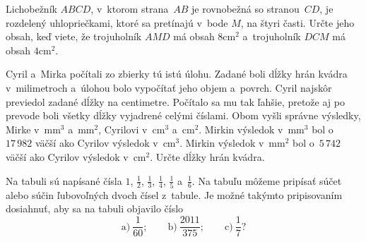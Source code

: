 {%
Lichobežník $ABCD$, v~ktorom strana~$AB$ je rovnobežná so stranou~$CD$, je
rozdelený uhlopriečkami, ktoré sa pretínajú v~bode $M$, na štyri časti.
Určte jeho obsah, keď viete, že trojuholník $AMD$ má obsah
$8\text{cm}^2$ a~trojuholník $DCM$  má obsah $4\text{cm}^2$.}

{%
Cyril a~Mirka počítali zo zbierky tú istú úlohu. Zadané boli dĺžky hrán
kvádra v~milimetroch a~úlohou bolo vypočítať jeho objem a~povrch. Cyril
najskôr previedol zadané dĺžky na centimetre. Počítalo sa mu tak ľahšie,
pretože aj po prevode boli všetky dĺžky vyjadrené celými číslami. Obom vyšli
správne výsledky, Mirke v~$\text{mm}^3$ a~$\text{mm}^2$, Cyrilovi v~$\text{cm}^3$ a~$\text{cm}^2$. Mirkin výsledok
v~$\text{mm}^3$ bol o~$17\,982$ väčší ako Cyrilov výsledok v~$\text{cm}^3$. Mirkin výsledok v~$\text{mm}^2$
bol o~$5\,742$ väčší ako Cyrilov výsledok v~$\text{cm}^2$. Určte dĺžky hrán kvádra.}

{%
Na tabuli sú napísané čísla $1$, $\frac12$, $\frac13$, $\frac14$,
$\frac15$ a~$\frac16$.
Na tabuľu môžeme pripísať súčet alebo súčin ľubovoľných dvoch čísel z~tabule.
Je možné takýmto pripisovaním dosiahnuť, aby sa na tabuli objavilo
číslo
$$
\text{a)}\ \frac1{60};\qquad
\text{b)}\ \frac{2011}{375};\qquad
\text{c)}\ \frac17?
$$}

